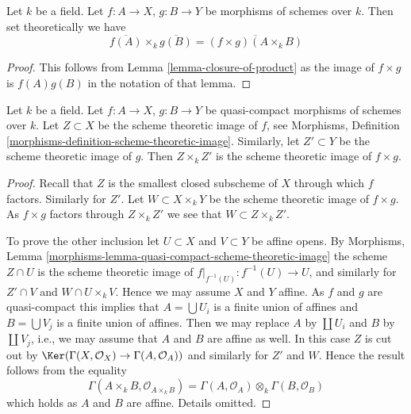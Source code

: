 \begin{lemma}
\label{lemma-closure-image-product-map}
Let $k$ be a field.
Let $f : A \to X$, $g : B \to Y$ be morphisms of schemes over $k$.
Then set theoretically we have
$$
\overline{f(A)} \times_k \overline{g(B)} =
\overline{(f \times g)(A \times_k B)}
$$
\end{lemma}

\begin{proof}
This follows from
Lemma \ref{lemma-closure-of-product}
as the image of $f \times g$ is $f(A)g(B)$
in the notation of that lemma.
\end{proof}

\begin{lemma}
\label{lemma-scheme-theoretic-image-product-map}
Let $k$ be a field.
Let $f : A \to X$, $g : B \to Y$ be quasi-compact morphisms of schemes
over $k$. Let $Z \subset X$ be the scheme theoretic image of $f$, see
Morphisms, Definition \ref{morphisms-definition-scheme-theoretic-image}.
Similarly, let $Z' \subset Y$ be the scheme theoretic image of $g$.
Then $Z \times_k Z'$ is the scheme theoretic image of $f \times g$.
\end{lemma}

\begin{proof}
Recall that $Z$ is the smallest closed subscheme of $X$ through which
$f$ factors. Similarly for $Z'$. Let $W \subset X \times_k Y$ be the
scheme theoretic image of $f \times g$. As $f \times g$ factors through
$Z \times_k Z'$ we see that $W \subset Z \times_k Z'$.

\medskip\noindent
To prove the other inclusion let $U \subset X$ and $V \subset Y$ be
affine opens. By
Morphisms, Lemma \ref{morphisms-lemma-quasi-compact-scheme-theoretic-image}
the scheme $Z \cap U$ is the scheme theoretic image of
$f|_{f^{-1}(U)} : f^{-1}(U) \to U$, and similarly for
$Z' \cap V$ and $W \cap U \times_k V$. Hence we may assume
$X$ and $Y$ affine. As $f$ and $g$ are quasi-compact this implies
that $A = \bigcup U_i$ is a finite union of affines and
$B = \bigcup V_j$ is a finite union of affines.
Then we may replace $A$ by $\coprod U_i$ and $B$ by
$\coprod V_j$, i.e., we may assume that $A$ and $B$ are affine as well.
In this case $Z$ is cut out by
$\Ker(\Gamma(X, \mathcal{O}_X) \to \Gamma(A, \mathcal{O}_A))$
and similarly for $Z'$ and $W$. Hence the result follows from
the equality
$$
\Gamma(A \times_k B, \mathcal{O}_{A \times_k B})
=
\Gamma(A, \mathcal{O}_A) \otimes_k \Gamma(B, \mathcal{O}_B)
$$
which holds as $A$ and $B$ are affine. Details omitted.
\end{proof}





